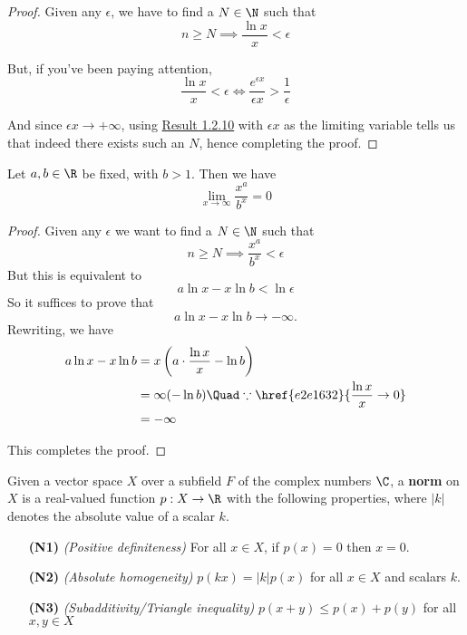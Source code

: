 \begin{proof}
  Given any $\epsilon$, we have to find a $N\in\N$ such that
  $$
    n\geq N\implies\frac{\ln x}x<\epsilon
  $$

  But, if you've been paying attention,
  $$
    \frac{\ln x}x<\epsilon\iff\frac{e^{\epsilon x}}{\epsilon x}>\frac1\epsilon
  $$

  And since $\epsilon x\to+\infty$, using \href{b905ee7}{Result 1.2.10} with
  $\epsilon x$ as the limiting variable tells us that indeed there exists such an
  $N$, hence completing the proof.
\end{proof}

\label{f3540b0}

Let $a,b\in\R$ be fixed, with $b>1$. Then we have
$$
  \lim_{x\to\infty}\frac{x^a}{b^x}=0
$$

\begin{proof}
  Given any $\epsilon$ we want to find a $N\in\N$ such that
  $$
    n\geq N\implies\frac{x^a}{b^x}<\epsilon
  $$
  But this is equivalent to
  $$
    a\ln x-x\ln b<\ln\epsilon
  $$
  So it suffices to prove that
  $$
    a\ln x-x\ln b\to-\infty.
  $$
  Rewriting, we have
  \begin{align*}
    a\ln x-x\ln b
     & = x\left(a\cdot\frac{\ln x}{x}-\ln b\right)                       \\
     & = \infty(-\ln b) \Quad\because\href{e2e1632}{\frac{\ln x}{x}\to0} \\
     & = -\infty
  \end{align*}

  This completes the proof.
\end{proof}

\label{e0fff96}

Given a vector space $X$ over a subfield $F$ of the complex numbers $\C$, a
\textbf{norm} on $X$ is a real-valued function $p:X\to\R$ with the following
properties, where $|k|$ denotes the absolute value of a scalar $k$.
\begin{enumerate}
  \item [\textbf{(N1)}] \textit{(Positive definiteness)} For all $x\in
        X$, if $p(x)=0$ then $x=0$.
  \item [\textbf{(N2)}] \textit{(Absolute homogeneity)}
        $p(kx)=|k|p(x)$ for all $x\in X$ and scalars $k$.
  \item [\textbf{(N3)}] \textit{(Subadditivity/Triangle inequality)}
        $p(x+y)\leq p(x)+p(y)$ for all $x,y\in X$
\end{enumerate}

